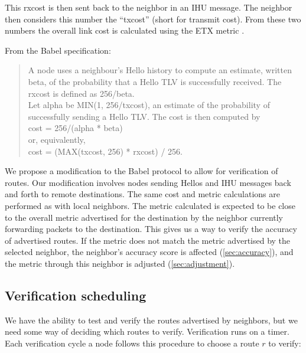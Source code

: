\documentclass[11pt]{article}
\begin{document}
This rxcost is then sent back to the neighbor in an IHU message. The neighbor then considers this number the ``txcost'' (short for transmit cost). From these two numbers the overall link cost is calculated using the ETX metric \cite{etx}.

\begin{minipage}[c]{\textwidth}
From the Babel specification:
\begin{quote}
A node uses a neighbour's Hello history to compute an estimate,
written beta, of the probability that a Hello TLV is successfully
received.  The rxcost is defined as 256/beta.\\

Let alpha be MIN(1, 256/txcost), an estimate of the probability of
successfully sending a Hello TLV.  The cost is then computed by\\

   cost = 256/(alpha * beta)\\

or, equivalently,\\

   cost = (MAX(txcost, 256) * rxcost) / 256.\\

\end{quote}
\end{minipage}

We propose a modification to the Babel protocol to allow for verification of routes. Our modification involves nodes sending Hellos and IHU messages back and forth to remote destinations. The same cost and metric calculations are performed as with local neighbors. The metric calculated is expected to be close to the overall metric advertised for the destination by the neighbor currently forwarding packets to the destination. This gives us a way to verify the accuracy of advertised routes. If the metric does not match the metric advertised by the selected neighbor, the neighbor’s accuracy score is affected (\autoref{sec:accuracy}), and the metric through this neighbor is adjusted (\autoref{sec:adjustment}).

\subsection{Verification scheduling}
We have the ability to test and verify the routes advertised by neighbors, but we need some way of deciding which routes to verify. Verification runs on a timer. Each verification cycle a node follows this procedure to choose a route $r$ to verify:
\end{document}
